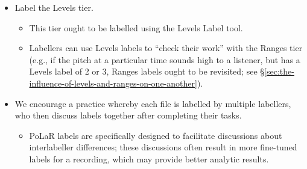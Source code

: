 \begin{itemize}
\begin{itemize}
		\end{itemize}
		\item Label the Levels tier.
		\begin{itemize}
			\item This tier ought to be labelled using the Levels Label tool.
			\item Labellers can use Levels labels to “check their work” with the Ranges tier (e.g., if the pitch at a particular time sounds high to a listener, but has a Levels label of 2 or 3, Ranges labels ought to be revisited; see §\ref{sec:the-influence-of-levels-and-ranges-on-one-another}).
		\end{itemize}
		\item We encourage a practice whereby each file is labelled by multiple labellers, who then discuss labels together after completing their tasks.
		\begin{itemize}
			\item PoLaR labels are specifically designed to facilitate discussions about interlabeller differences; these discussions often result in more fine-tuned labels for a recording, which may provide better analytic results.
		\end{itemize}
	\end{itemize}

